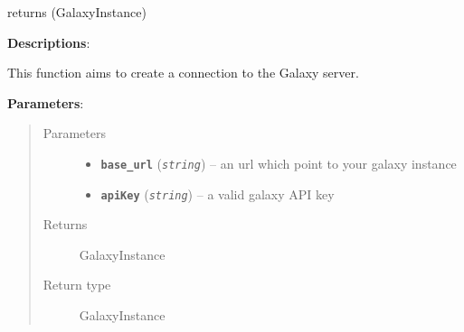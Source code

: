 \documentclass[letterpaper,10pt,english]{sphinxmanual}
\begin{document}
\begin{fulllineitems}
\label{datamanagerpkg:datamanagerpkg.GalaxyCommunication_data_manager.galaxyConnection}
returns (GalaxyInstance)

\textbf{Descriptions}:

This function aims to create a connection to the Galaxy server.

\textbf{Parameters}:
\begin{quote}\begin{description}
\item[{Parameters}] \leavevmode\begin{itemize}
\item {} 
\textbf{\texttt{base\_url}} (\emph{\texttt{string}}) -- an url which point to your galaxy instance

\item {} 
\textbf{\texttt{apiKey}} (\emph{\texttt{string}}) -- a valid galaxy API key

\end{itemize}

\item[{Returns}] \leavevmode
GalaxyInstance

\item[{Return type}] \leavevmode
GalaxyInstance

\end{description}\end{quote}

\end{fulllineitems}

\end{document}
